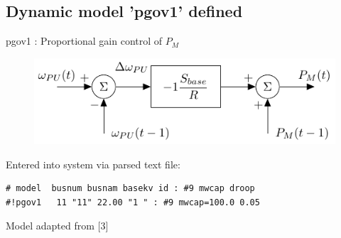 \documentclass[14pt, unknownkeysallowed]{beamer}
\begin{document}
\subsection{Dynamic model 'pgov1' defined}
\begin{frame}[fragile]
pgov1 : Proportional gain control of $P_M$ \\

\begin{figure}
	\includegraphics[width=\linewidth]{pgov1}
\end{figure}\vspace{-1em}
Entered into system via parsed text file:
\begin{lstlisting}[frame=single, basicstyle=\footnotesize]
# model  busnum busnam basekv id : #9 mwcap droop
#!pgov1   11 "11" 22.00 "1 " : #9 mwcap=100.0 0.05
\end{lstlisting}\vspace{-0.5em}
\footnotesize Model adapted from [3]
\end{frame}

\end{document}
